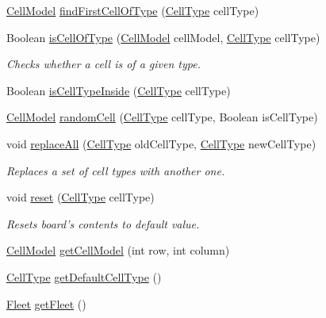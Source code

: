 \begin{DoxyCompactItemize}
\hyperlink{classbattleship2D_1_1model_1_1CellModel}{Cell\-Model} \hyperlink{classbattleship2D_1_1model_1_1BoardModel_a91ddb22e8123ffd145fc5c05585110f8}{find\-First\-Cell\-Of\-Type} (\hyperlink{enumbattleship2D_1_1model_1_1CellType}{Cell\-Type} cell\-Type)
\item 
Boolean \hyperlink{classbattleship2D_1_1model_1_1BoardModel_a4a79e7a8f51182ced9478fee68f7842a}{is\-Cell\-Of\-Type} (\hyperlink{classbattleship2D_1_1model_1_1CellModel}{Cell\-Model} cell\-Model, \hyperlink{enumbattleship2D_1_1model_1_1CellType}{Cell\-Type} cell\-Type)
\begin{DoxyCompactList}\small\item\em Checks whether a cell is of a given type. \end{DoxyCompactList}\item 
Boolean \hyperlink{classbattleship2D_1_1model_1_1BoardModel_a3a7275142b51bcf384bc40c8836038e4}{is\-Cell\-Type\-Inside} (\hyperlink{enumbattleship2D_1_1model_1_1CellType}{Cell\-Type} cell\-Type)
\item 
\hyperlink{classbattleship2D_1_1model_1_1CellModel}{Cell\-Model} \hyperlink{classbattleship2D_1_1model_1_1BoardModel_a528b0e9bf9dbd8cfd0f9f3754cea5d79}{random\-Cell} (\hyperlink{enumbattleship2D_1_1model_1_1CellType}{Cell\-Type} cell\-Type, Boolean is\-Cell\-Type)
\item 
void \hyperlink{classbattleship2D_1_1model_1_1BoardModel_a28b2129ced4821bddf7a3c5e27bfbf8e}{replace\-All} (\hyperlink{enumbattleship2D_1_1model_1_1CellType}{Cell\-Type} old\-Cell\-Type, \hyperlink{enumbattleship2D_1_1model_1_1CellType}{Cell\-Type} new\-Cell\-Type)
\begin{DoxyCompactList}\small\item\em Replaces a set of cell types with another one. \end{DoxyCompactList}\item 
void \hyperlink{classbattleship2D_1_1model_1_1BoardModel_a7aa5da807e5e13cd066ff43096c0f159}{reset} (\hyperlink{enumbattleship2D_1_1model_1_1CellType}{Cell\-Type} cell\-Type)
\begin{DoxyCompactList}\small\item\em Resets board's contents to default value. \end{DoxyCompactList}\item 
\hyperlink{classbattleship2D_1_1model_1_1CellModel}{Cell\-Model} \hyperlink{classbattleship2D_1_1model_1_1BoardModel_afa03fdf7f571196dcf71d6dd6026f5c2}{get\-Cell\-Model} (int row, int column)
\item 
\hyperlink{enumbattleship2D_1_1model_1_1CellType}{Cell\-Type} \hyperlink{classbattleship2D_1_1model_1_1BoardModel_accfa1eebdda7de04ac59c2399d27eeef}{get\-Default\-Cell\-Type} ()
\item 
\hyperlink{classbattleship2D_1_1model_1_1Fleet}{Fleet} \hyperlink{classbattleship2D_1_1model_1_1BoardModel_a4071154c05caa46d691892f565ff9aeb}{get\-Fleet} ()
\end{DoxyCompactItemize}
